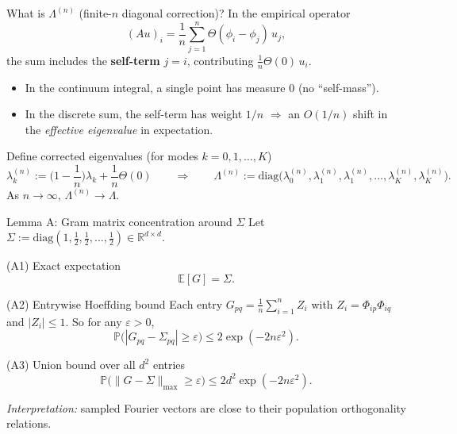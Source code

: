 \documentclass[10pt,aspectratio=169]{beamer}
\newcommand{\E}{\mathbb{E}}
\newcommand{\R}{\mathbb{R}}
\begin{document}
\begin{frame}{What is $\Lambda^{(n)}$ (finite-$n$ diagonal correction)?}
	\small
	In the empirical operator
	\[
		(Au)_i=\frac{1}{n}\sum_{j=1}^n \Theta(\phi_i-\phi_j)\,u_j,
	\]
	the sum includes the \textbf{self-term} $j=i$, contributing $\frac{1}{n}\Theta(0)\,u_i$.

	\begin{itemize}
		\item In the continuum integral, a single point has measure $0$ (no ``self-mass'').
		\item 		In the discrete sum, the self-term has weight $1/n$ $\Rightarrow$ an $O(1/n)$ shift in the
		      \emph{effective eigenvalue} in expectation.

	\end{itemize}

	\begin{block}{Define corrected eigenvalues (for modes $k=0,1,\dots,K$)}
		\[
			\boxed{
				\lambda_k^{(n)} := \Big(1-\frac{1}{n}\Big)\lambda_k+\frac{1}{n}\Theta(0)
			}
			\qquad\Rightarrow\qquad
			\boxed{
				\Lambda^{(n)} := \mathrm{diag}\!\big(\lambda_0^{(n)},\lambda_1^{(n)},\lambda_1^{(n)},\dots,\lambda_K^{(n)},\lambda_K^{(n)}\big).
			}
		\]
		As $n\to\infty$, $\Lambda^{(n)}\to \Lambda$.
	\end{block}

\end{frame}


\begin{frame}{Lemma A: Gram matrix concentration around $\Sigma$}
	\small
	Let $\Sigma:=\mathrm{diag}(1,\tfrac12,\tfrac12,\dots,\tfrac12)\in\R^{d\times d}$.

	\begin{block}{(A1) Exact expectation}
		\[
			\boxed{\E[G]=\Sigma.}
		\]
	\end{block}

	\begin{block}{(A2) Entrywise Hoeffding bound}
		\vspace{1em}
		Each entry $G_{pq}=\frac{1}{n}\sum_{i=1}^n Z_i$ with $Z_i=\Phi_{ip}\Phi_{iq}$ and $|Z_i|\le 1$.
		So for any $\varepsilon>0$,
		\[
			\boxed{
				\mathbb{P}\big(|G_{pq}-\Sigma_{pq}|\ge \varepsilon\big)\le 2\exp(-2n\varepsilon^2).
			}
		\]
	\end{block}

	\begin{block}{(A3) Union bound over all $d^2$ entries}
		\[
			\boxed{
				\mathbb{P}\big(\|G-\Sigma\|_{\max}\ge \varepsilon\big)\le 2d^2\exp(-2n\varepsilon^2).
			}
		\]
	\end{block}

	\textit{Interpretation:} sampled Fourier vectors are close to their population orthogonality relations.

\end{frame}
\end{document}
